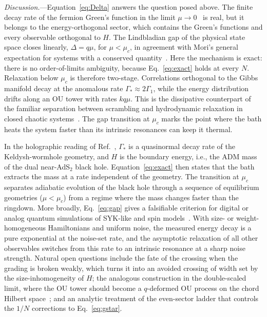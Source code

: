 \documentclass[aps,prl,twocolumn,superscriptaddress,amsmath,amssymb,10pt]{revtex4-2}
\begin{document}
\emph{Discussion.}---Equation~\eqref{eq:Delta} answers the question posed above. The finite decay rate of the fermion Green's function in the limit $\mu\to0$~\cite{Kulkarni2022,Garcia2023} is real, but it belongs to the energy-orthogonal sector, which contains the Green's functions and every observable orthogonal to $H$. The Lindbladian gap of the physical state space closes linearly, $\Delta=q\mu$, for $\mu<\mu_c$, in agreement with Mori's general expectation for systems with a conserved quantity~\cite{Mori2024}. Here the mechanism is exact: there is no order-of-limits ambiguity, because Eq.~\eqref{eq:exact} holds at every $N$. Relaxation below $\mu_c$ is therefore two-stage. Correlations orthogonal to the Gibbs manifold decay at the anomalous rate $\Gamma_\ast\approx2\Gamma_1$, while the energy distribution drifts along an OU tower with rates $kq\mu$. This is the dissipative counterpart of the familiar separation between scrambling and hydrodynamic relaxation in closed chaotic systems~\cite{Jacoby2025,Zhang2026}. The gap transition at $\mu_c$ marks the point where the bath heats the system faster than its intrinsic resonances can keep it thermal.

In the holographic reading of Ref.~\cite{Garcia2023}, $\Gamma_\ast$ is a quasinormal decay rate of the Keldysh-wormhole geometry, and $H$ is the boundary energy, i.e., the ADM mass of the dual near-AdS$_2$ black hole. Equation~\eqref{eq:exact} then states that the bath extracts the mass at a rate independent of the geometry. The transition at $\mu_c$ separates adiabatic evolution of the black hole through a sequence of equilibrium geometries ($\mu<\mu_c$) from a regime where the mass changes faster than the ringdown. More broadly, Eq.~\eqref{eq:gap} gives a falsifiable criterion for digital or analog quantum simulations of SYK-like and spin models~\cite{Danshita2017,Jafferis2022}. With size- or weight-homogeneous Hamiltonians and uniform noise, the measured energy decay is a pure exponential at the noise-set rate, and the asymptotic relaxation of all other observables switches from this rate to an intrinsic resonance at a sharp noise strength. Natural open questions include the fate of the crossing when the grading is broken weakly, which turns it into an avoided crossing of width set by the size-inhomogeneity of $H$; the analogous construction in the double-scaled limit, where the OU tower should become a $q$-deformed OU process on the chord Hilbert space~\cite{Berkooz2019,Lin2022}; and an analytic treatment of the even-sector ladder that controls the $1/N$ corrections to Eq.~\eqref{eq:gstar}.
\end{document}
